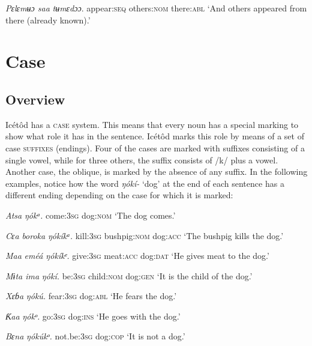 \textit{Pɛlɛmʉɔ   saa     }\textit{tʉmɛdɔɔ}.
appear:\textsc{seq}   others:\textsc{nom}   there:\textsc{abl}
‘And others appeared from there (already known).’




\section{Case}



\subsection{Overview}


Icétôd has a \textsc{case }system. This means that every noun has a special marking to show what role it has in the sentence. Icétôd marks this role by means of a set of case \textsc{suffixes} (endings). Four of the cases are marked with suffixes consisting of a single vowel, while for three others, the suffix consists of /k/ plus a vowel. Another case, the oblique, is marked by the absence of any suffix. In the following examples, notice how the word \textit{ŋókí- }‘dog’ at the end of each sentence has a different ending depending on the case for which it is marked:




\textit{Atsa}     \textit{ŋókᵃ.}
come:\textsc{3sg}   dog:\textsc{nom}
‘The dog comes.’




\textit{Cɛa}     \textit{boroka}     \textit{ŋókíkᵃ.}
kill:\textsc{3sg}   bushpig:\textsc{nom}   dog:\textsc{acc}
‘The bushpig kills the dog.’




\textit{Maa}     \textit{eméá     ŋókíkᵉ.}
give:\textsc{3sg}   meat:\textsc{acc}   dog:\textsc{dat}
‘He gives meat to the dog.’




\textit{Mɨta     ima}     \textit{ŋókí.}
be:\textsc{3sg}   child:\textsc{nom}   dog:\textsc{gen}
‘It is the child of the dog.’




\textit{Xɛɓa}     \textit{ŋókú.}
fear:\textsc{3sg}   dog:\textsc{abl}
‘He fears the dog.’




\textit{Ƙaa}     \textit{ŋókᵒ.}
go:\textsc{3sg}  dog:\textsc{ins}
‘He goes with the dog.’




\textit{Bɛna}     \textit{ŋókúkᵒ.}
not.be:\textsc{3sg}  dog:\textsc{cop}
‘It is not a dog.’




